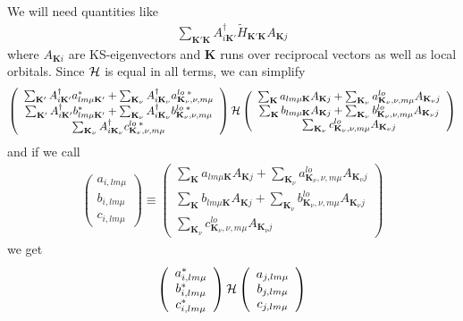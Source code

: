 \documentclass[aps,prb,floatfix,epsfig,singlecolumn,showpacs,preprintnumbers]{revtex4}
\newcommand{\vK}{{\mathbf{K}}}
\newcommand{\cH}{{\cal H}}
\begin{document}
We will need quantities like
\begin{eqnarray}
\sum_{\vK'\vK}A^\dagger_{i\vK'}\widetilde{H}_{\vK'\vK} A_{\vK j}
\end{eqnarray}
where $A_{\vK i}$ are KS-eigenvectors and $\vK$ runs over reciprocal
vectors as well as local orbitals.
Since $\cH$ is equal in all terms, we can simplify
\begin{eqnarray}
\left(
\begin{array}{c}
\sum_{\vK'} A^\dagger_{i\vK'} a^*_{lm\mu\vK'}+\sum_{\vK_\nu}A^\dagger_{i\vK_\nu}a^{lo\;*}_{\vK_\nu,\nu,m\mu}\\
\sum_{\vK'} A^\dagger_{i\vK'} b^*_{lm\mu\vK'}+\sum_{\vK_\nu}A^\dagger_{i\vK_\nu}b^{lo\;*}_{\vK_\nu,\nu,m\mu}\\
\sum_{\vK_\nu}A^\dagger_{i\vK_\nu}c^{lo\;*}_{\vK_\nu,\nu,m\mu}
\end{array}
\right)\cH
\left(
\begin{array}{c}
\sum_{\vK} a_{lm\mu\vK}A_{\vK j}  +\sum_{\vK_\nu}a^{lo}_{\vK_\nu,\nu,m\mu}A_{\vK_\nu j}\\
\sum_{\vK} b_{lm\mu\vK}A_{\vK j}  +\sum_{\vK_\nu}b^{lo}_{\vK_\nu,\nu,m\mu}A_{\vK_\nu j}\\
\sum_{\vK_\nu}c^{lo}_{\vK_\nu,\nu,m\mu}A_{\vK_\nu j}
\end{array}
\right)
\end{eqnarray}
and if we call 
\begin{eqnarray}
\left(
\begin{array}{c}
a_{i,lm\mu}\\
b_{i,lm\mu}\\
c_{i,lm\mu}
\end{array}
\right)
\equiv
\left(
\begin{array}{c}
\sum_{\vK} a_{lm\mu\vK}A_{\vK j}  +\sum_{\vK_\nu}a^{lo}_{\vK_\nu,\nu,m\mu}A_{\vK_\nu j}\\
\sum_{\vK} b_{lm\mu\vK}A_{\vK j}  +\sum_{\vK_\nu}b^{lo}_{\vK_\nu,\nu,m\mu}A_{\vK_\nu j}\\
\sum_{\vK_\nu}c^{lo}_{\vK_\nu,\nu,m\mu}A_{\vK_\nu j}
\end{array}
\right)
\end{eqnarray}
we get
\begin{eqnarray}
\left(
\begin{array}{c}
a_{i,lm\mu}^*\\
b_{i,lm\mu}^*\\
c_{i,lm\mu}^*
\end{array}
\right)\cH
\left(
\begin{array}{c}
a_{j,lm\mu}\\
b_{j,lm\mu}\\
c_{j,lm\mu}
\end{array}
\right)
\end{eqnarray}
\end{document}
